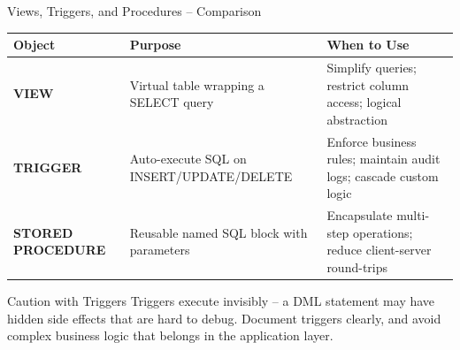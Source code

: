 \begin{frame}{Views, Triggers, and Procedures -- Comparison}
  \begin{center}
  \renewcommand{\arraystretch}{1.35}
  \begin{tabularx}{\linewidth}{@{}lXX@{}}
    \toprule
    \textbf{Object} & \textbf{Purpose} & \textbf{When to Use} \\
    \midrule
    \textbf{VIEW}
      & Virtual table wrapping a SELECT query
      & Simplify queries; restrict column access; logical abstraction \\[4pt]
    \textbf{TRIGGER}
      & Auto-execute SQL on INSERT/UPDATE/DELETE
      & Enforce business rules; maintain audit logs; cascade custom logic \\[4pt]
    \textbf{STORED PROCEDURE}
      & Reusable named SQL block with parameters
      & Encapsulate multi-step operations; reduce client-server round-trips \\
    \bottomrule
  \end{tabularx}
  \end{center}

  \begin{alertblock}{Caution with Triggers}
    Triggers execute invisibly -- a DML statement may have hidden side effects that are hard to
    debug. Document triggers clearly, and avoid complex business logic that belongs in the
    application layer.
  \end{alertblock}
\end{frame}
